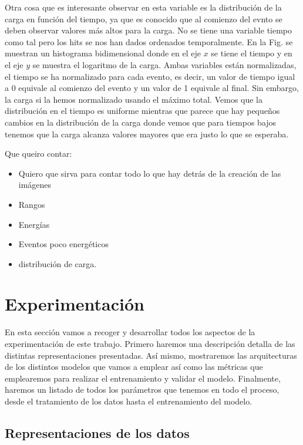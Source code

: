 \documentclass[a4paper,12pt,twoside,titlepage]{article}
\begin{document}
Otra cosa que es interesante observar en esta variable es la distribución de la carga en función del tiempo, ya que es conocido que al comienzo del evnto se deben observar valores más altos para la carga. No se tiene una variable tiempo como tal pero los hits se nos han dados ordenados temporalmente. En la Fig. se muestran un histograma bidimensional donde en el eje $x$ se tiene el tiempo y en el eje $y$ se muestra el logaritmo de la carga. Ambas variables están normalizadas, el tiempo se ha normalizado para cada evento, es decir, un valor de tiempo igual a 0 equivale al comienzo del evento y un valor de 1 equivale al final. Sin embargo, la carga si la hemos normalizado usando el máximo total. Vemos que la distribución en el tiempo es uniforme mientras que parece que hay pequeños cambios en la distribución de la carga donde vemos que para tiempos bajos tenemos que la carga alcanza valores mayores que era justo lo que se esperaba.



Que queiro contar:
\begin{itemize}
  \item Quiero que sirva para contar todo lo que hay detrás de la creación de las imágenes
  \item Rangos
  \item Energías
  \item Eventos poco energéticos
  \item distribución de carga.
\end{itemize}

\section{Experimentación}
\label{sec:arch}

En esta sección vamos a recoger y desarrollar todos los aspectos de la experimentación de este trabajo. Primero haremos una descripción detalla de las distintas representaciones presentadas. Así mismo, mostraremos las arquitecturas de los distintos modelos que vamos a emplear así como las métricas que emplearemos para realizar el entrenamiento y validar el modelo. Finalmente, haremos un listado de todos los parámetros que tenemos en todo el proceso, desde el tratamiento de los datos hasta el entrenamiento del modelo.

\subsection{Representaciones de los datos}
\end{document}
